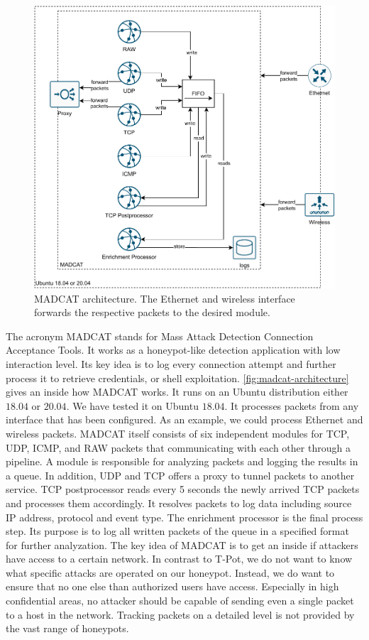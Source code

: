 \begin{figure}[ht]
    \centering
    \includegraphics[width=\textwidth]{figures/heicat-architecture.pdf}
    \caption[MADCAT architecture]{MADCAT architecture. The Ethernet and wireless interface forwards the respective packets to the desired module.}
    \label{fig:madcat-architecture}
\end{figure}

The acronym MADCAT stands for Mass Attack Detection Connection Acceptance Tools.
It works as a honeypot-like detection application with low interaction level.
Its key idea is to log every connection attempt and further process it to retrieve credentials, or shell exploitation.
\autoref{fig:madcat-architecture} gives an inside how MADCAT works.
It runs on an Ubuntu distribution either $18.04$ or $20.04$.
We have tested it on Ubuntu $18.04$.
It processes packets from any interface that has been configured.
As an example, we could process Ethernet and wireless packets.
MADCAT itself consists of six independent modules for TCP, UDP, ICMP, and RAW packets that communicating with each other through a pipeline.
A module is responsible for analyzing packets and logging the results in a queue.
In addition, UDP and TCP offers a proxy to tunnel packets to another service.
TCP postprocessor reads every 5 seconds the newly arrived TCP packets and processes them accordingly.
It resolves packets to log data including source IP address, protocol and event type.
The enrichment processor is the final process step.
Its purpose is to log all written packets of the queue in a specified format for further analyzation.
The key idea of MADCAT is to get an inside if attackers have access to a certain network.
In contrast to T-Pot, we do not want to know what specific attacks are operated on our honeypot.
Instead, we do want to ensure that no one else than authorized users have access.
Especially in high confidential areas, no attacker should be capable of sending even a single packet to a host in the network.
Tracking packets on a detailed level is not provided by the vast range of honeypots.

